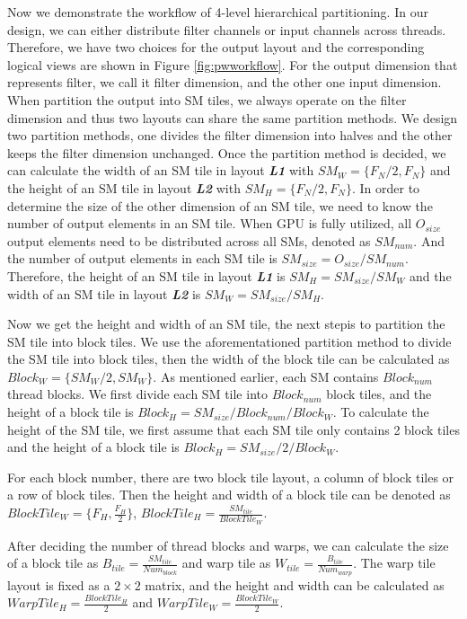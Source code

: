 Now we demonstrate the workflow of 4-level hierarchical partitioning.
In our design, we can either distribute filter channels or input channels across threads. 
Therefore, we have two choices for the output layout and the corresponding logical views are shown in Figure \ref{fig:pwworkflow}.
For the output dimension that represents filter, we call it filter dimension, and the other one input dimension.
When partition the output into SM tiles, we always operate on the filter dimension and thus two layouts can share the same partition methods.
We design two partition methods, one divides the filter dimension into halves and the other keeps the filter dimension unchanged.
Once the partition method is decided, we can calculate the width of an SM tile in layout \textbf{\emph{L1}} with $SM_{W}=\{F_N/2,F_N\}$ and the height of an SM tile in layout \textbf{\emph{L2}} with $SM_{H}=\{F_N/2,F_N\}$.
In order to determine the size of the other dimension of an SM tile, we need to know the number of output elements in an SM tile.
When GPU is fully utilized, all $O_{size}$ output elements need to be distributed across all SMs, denoted as $SM_{num}$.
And the number of output elements in each SM tile is $SM_{size}=O_{size}/SM_{num}$.
Therefore, the height of an SM tile in layout \textbf{\emph{L1}} is $SM_{H}=SM_{size}/SM_W$ and the width of an SM tile in layout \textbf{\emph{L2}} is $SM_{W}=SM_{size}/SM_H$.

Now we get the height and width of an SM tile, {\color{red}the next step}is to partition the SM tile into block tiles.
We use the aforementationed partition method to divide the SM tile into block tiles, then the width of the block tile can be calculated as $Block_{W}=\{SM_W/2,SM_W\}$.
As mentioned earlier, each SM contains $Block_{num}$ thread blocks. 
We first divide each SM tile into $Block_{num}$ block tiles, and the height of a block tile is $Block_{H}=SM_{size}/Block_{num}/Block_{W}$.
To calculate the height of the SM tile, we first assume that each SM tile only contains 2 block tiles and the height of a block tile is $Block_{H}=SM_{size}/2/Block_{W}$.




For each block number, there are two block tile layout, a column of block tiles or a row of block tiles. 
Then the height and width of a block tile can be denoted as $BlockTile_W=\{F_H, \frac{F_H}{2}\}$, $BlockTile_H=\frac{SM_{tile}}{BlockTile_W}$.

After deciding the number of thread blocks and warps, we can calculate the size of a block tile as $B_{tile}=\frac{SM_{tile}}{Num_{block}}$ and warp tile as $W_{tile}=\frac{B_{tile}}{Num_{warp}}$.
The warp tile layout is fixed as a $2\times2$ matrix, and the height and width can be calculated as $WarpTile_H=\frac{BlockTile_H}{2}$ and $WarpTile_W=\frac{BlockTile_W}{2}$.

